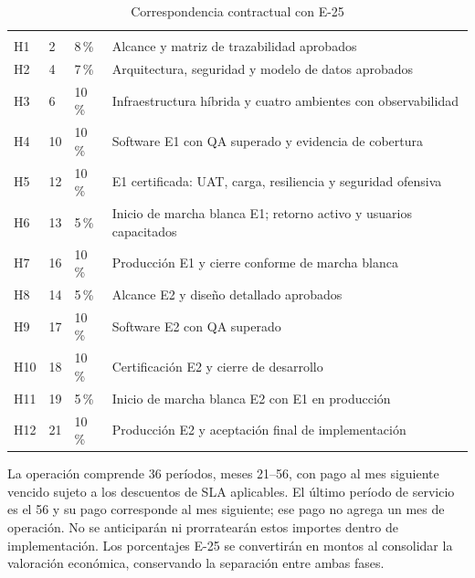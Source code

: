 \begin{longtable}{L{12mm}R{12mm}R{14mm}L{110mm}}
\caption{Correspondencia contractual con E-25}\label{tab:sd7-e25}\\\hline
  &  &  & \\\hline\endfirsthead
\hline {} &  &  & \\\hline\endhead
H1 & 2 & 8\,\% & Alcance y matriz de trazabilidad aprobados \\\hline
H2 & 4 & 7\,\% & Arquitectura, seguridad y modelo de datos aprobados\\\hline
H3 & 6 & 10\,\% & Infraestructura híbrida y cuatro ambientes con observabilidad \\\hline
H4 & 10 & 10\,\% & Software E1 con QA superado y evidencia de cobertura\\\hline
H5 & 12 & 10\,\% & E1 certificada: UAT, carga, resiliencia y seguridad ofensiva \\\hline
H6 & 13 & 5\,\% & Inicio de marcha blanca E1; retorno activo y usuarios capacitados\\\hline
H7 & 16 & 10\,\% & Producción E1 y cierre conforme de marcha blanca \\\hline
H8 & 14 & 5\,\% & Alcance E2 y diseño detallado aprobados\\\hline
H9 & 17 & 10\,\% & Software E2 con QA superado \\\hline
H10 & 18 & 10\,\% & Certificación E2 y cierre de desarrollo\\\hline
H11 & 19 & 5\,\% & Inicio de marcha blanca E2 con E1 en producción \\\hline
H12 & 21 & 10\,\% & Producción E2 y aceptación final de implementación\\\hline
\end{longtable}

La operación comprende 36 períodos, meses 21--56, con pago al mes siguiente vencido sujeto a los descuentos de SLA aplicables. El último período de servicio es el 56 y su pago corresponde al mes siguiente; ese pago no agrega un mes de operación. No se anticiparán ni prorratearán estos importes dentro de implementación. Los porcentajes E-25 se convertirán en montos al consolidar la valoración económica, conservando la separación entre ambas fases.




